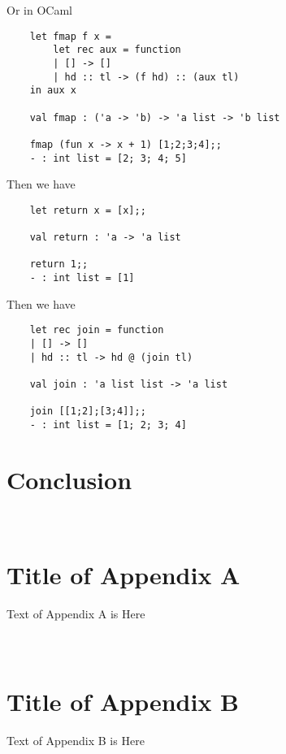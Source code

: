\documentclass[a4paper,10pt]{article}
\theoremstyle{definition}
\begin{document}
Or in OCaml
\begin{verbatim}
    let fmap f x =
        let rec aux = function
        | [] -> []
        | hd :: tl -> (f hd) :: (aux tl)
    in aux x

    val fmap : ('a -> 'b) -> 'a list -> 'b list

    fmap (fun x -> x + 1) [1;2;3;4];;
    - : int list = [2; 3; 4; 5]

\end{verbatim}
Then we have
\begin{verbatim}
    let return x = [x];;

    val return : 'a -> 'a list

    return 1;;
    - : int list = [1]
\end{verbatim}
Then we have
\begin{verbatim}
    let rec join = function
    | [] -> []
    | hd :: tl -> hd @ (join tl)

    val join : 'a list list -> 'a list

    join [[1;2];[3;4]];;
    - : int list = [1; 2; 3; 4]
\end{verbatim}

\pagebreak
\section{Conclusion}

\pagebreak
\appendix
\section{\\Title of Appendix A}

Text of Appendix A is Here

\section{\\Title of Appendix B}

Text of Appendix B is Here
\pagebreak


\end{document}
